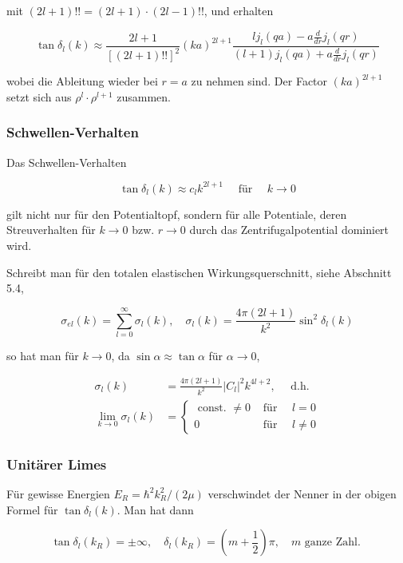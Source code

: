 \documentclass[10pt, letterpaper]{article}
\begin{document}
mit $(2 l+1)!!=(2 l+1) \cdot(2 l-1)!!$, und erhalten

$$
\tan \delta_{l}(k) \approx \frac{2 l+1}{[(2 l+1)!!]^{2}}(k a)^{2 l+1} \frac{l j_{l}(q a)-a \frac{d}{d r} j_{l}(q r)}{(l+1) j_{l}(q a)+a \frac{d}{d r} j_{l}(q r)}
$$

wobei die Ableitung wieder bei $r=a$ zu nehmen sind. Der Factor $(k a)^{2 l+1}$ setzt sich aus $\rho^{l} \cdot \rho^{l+1}$ zusammen.

\subsubsection*{Schwellen-Verhalten}
Das Schwellen-Verhalten

$$
\tan \delta_{l}(k) \approx c_{l} k^{2 l+1} \quad \text { für } \quad k \rightarrow 0
$$

gilt nicht nur für den Potentialtopf, sondern für alle Potentiale, deren Streuverhalten für $k \rightarrow 0$ bzw. $r \rightarrow 0$ durch das Zentrifugalpotential dominiert wird.

Schreibt man für den totalen elastischen Wirkungsquerschnitt, siehe Abschnitt 5.4,

$$
\sigma_{e l}(k)=\sum_{l=0}^{\infty} \sigma_{l}(k), \quad \sigma_{l}(k)=\frac{4 \pi(2 l+1)}{k^{2}} \sin ^{2} \delta_{l}(k)
$$

so hat man für $k \rightarrow 0$, da $\sin \alpha \approx \tan \alpha$ für $\alpha \rightarrow 0$,

$$
\begin{aligned}
\sigma_{l}(k) & =\frac{4 \pi(2 l+1)}{k^{2}}\left|C_{l}\right|^{2} k^{4 l+2}, \quad \text { d.h. } \\
\lim _{k \rightarrow 0} \sigma_{l}(k) & = \begin{cases}\text { const. } \neq 0 & \text { für } \quad l=0 \\
0 & \text { für } \quad l \neq 0\end{cases}
\end{aligned}
$$

\subsubsection*{Unitärer Limes}
Für gewisse Energien $E_{R}=\hbar^{2} k_{R}^{2} /(2 \mu)$ verschwindet der Nenner in der obigen Formel für $\tan \delta_{l}(k)$. Man hat dann

$$
\tan \delta_{l}\left(k_{R}\right)= \pm \infty, \quad \delta_{l}\left(k_{R}\right)=\left(m+\frac{1}{2}\right) \pi, \quad m \text { ganze Zahl. }
$$
\end{document}
